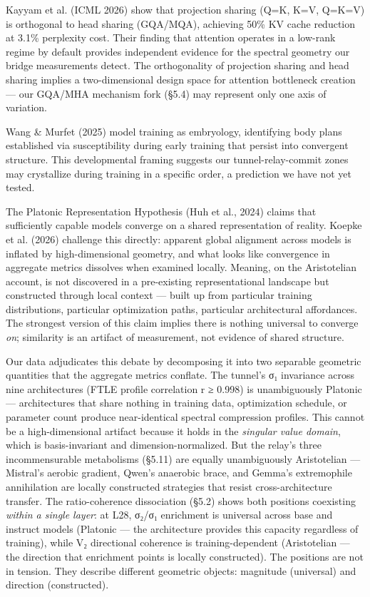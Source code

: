 \documentclass[12pt]{article}
\begin{document}
Kayyam et al. (ICML 2026) show that projection sharing (Q=K, K=V, Q=K=V) is orthogonal to head sharing (GQA/MQA), achieving 50\% KV cache reduction at 3.1\% perplexity cost. Their finding that attention operates in a low-rank regime by default provides independent evidence for the spectral geometry our bridge measurements detect. The orthogonality of projection sharing and head sharing implies a two-dimensional design space for attention bottleneck creation — our GQA/MHA mechanism fork (§5.4) may represent only one axis of variation.

Wang \& Murfet (2025) model training as embryology, identifying body plans established via susceptibility during early training that persist into convergent structure. This developmental framing suggests our tunnel-relay-commit zones may crystallize during training in a specific order, a prediction we have not yet tested.

The Platonic Representation Hypothesis (Huh et al., 2024) claims that sufficiently capable models converge on a shared representation of reality. Koepke et al. (2026) challenge this directly: apparent global alignment across models is inflated by high-dimensional geometry, and what looks like convergence in aggregate metrics dissolves when examined locally. Meaning, on the Aristotelian account, is not discovered in a pre-existing representational landscape but constructed through local context — built up from particular training distributions, particular optimization paths, particular architectural affordances. The strongest version of this claim implies there is nothing universal to converge \textit{on}; similarity is an artifact of measurement, not evidence of shared structure.

Our data adjudicates this debate by decomposing it into two separable geometric quantities that the aggregate metrics conflate. The tunnel's σ₁ invariance across nine architectures (FTLE profile correlation r ≥ 0.998) is unambiguously Platonic — architectures that share nothing in training data, optimization schedule, or parameter count produce near-identical spectral compression profiles. This cannot be a high-dimensional artifact because it holds in the \textit{singular value domain}, which is basis-invariant and dimension-normalized. But the relay's three incommensurable metabolisms (§5.11) are equally unambiguously Aristotelian — Mistral's aerobic gradient, Qwen's anaerobic brace, and Gemma's extremophile annihilation are locally constructed strategies that resist cross-architecture transfer. The ratio-coherence dissociation (§5.2) shows both positions coexisting \textit{within a single layer}: at L28, σ₂/σ₁ enrichment is universal across base and instruct models (Platonic — the architecture provides this capacity regardless of training), while V₂ directional coherence is training-dependent (Aristotelian — the direction that enrichment points is locally constructed). The positions are not in tension. They describe different geometric objects: magnitude (universal) and direction (constructed).
\end{document}
